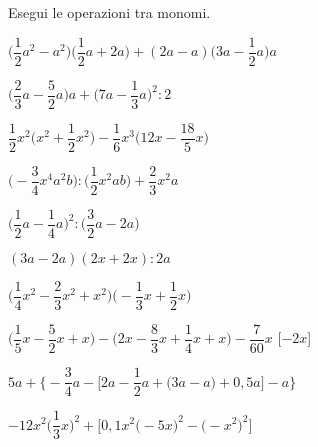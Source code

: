 \begin{esercizio}[\Ast]
 \label{ese:9.33}
Esegui le operazioni tra monomi.

\begin{enumeratea}
 \item 
\(\bigg(\dfrac{1}{2}a^{2}-a^{2}\bigg)\bigg(\dfrac{1}{2}
a+2a\bigg)+(2a-a)\bigg(3a-\dfrac{1}{2}a\bigg)a\)
 \item 
\(\bigg(\dfrac{2}{3}a-\dfrac{5}{2}a\bigg)a+\bigg(7a-\dfrac{1}{3}a\bigg)^{2}:2\)
 \item 
\(\dfrac{1}{2}x^{2}\bigg(x^{2}+\dfrac{1}{2}x^{2}\bigg)-\dfrac{1}{6}x^{3}
\bigg(12x-\dfrac{18}{5}x\bigg)\)
 \item 
\(\bigg(-{\dfrac{3}{4}}x^{4}a^{2}b\bigg):\bigg(\dfrac{1}{2}x^{2}ab\bigg)+\dfrac{2
}{3}x^{2}a\)
 \item 
\(\bigg(\dfrac{1}{2}a-\dfrac{1}{4}a\bigg)^{2}:\bigg(\dfrac{3}{2}a-2a\bigg)\)
 \item \((3a-2a)(2x+2x):2a\)
% 
% 
 \item 
\(\bigg(\dfrac{1}{4}x^{2}-\dfrac{2}{3}x^{2}+x^{2}\bigg)\bigg(-{\dfrac{1}{3}}
x+\dfrac{1}{2}x\bigg)\)
  \hfill{}
 \item 
\(\bigg(\dfrac{1}{5}x-\dfrac{5}{2}x+x\bigg)-\bigg(2x-\dfrac{8}{3}x+\dfrac{1}{4}
x+x\bigg)-\dfrac{7}{60}x\)
  \hfill[\(-2x\)]
 \item 
\(5a+\Bigg\{-{\dfrac{3}{4}}a-\bigg[2a-\dfrac{1}{2}a+\big(3a-a\big)+0,5a\bigg]
-a\Bigg\}\)
  \hfill{}
 \item 
\(-12x^{2}\bigg(\dfrac{1}{3}x\bigg)^{2}+\bigg[0,1x^{2}\big(-5x\big)^{2}-\big(-x^{
2}\big)^{2}\bigg]\)
  \hfill{}%

\end{enumeratea}
\end{esercizio}

